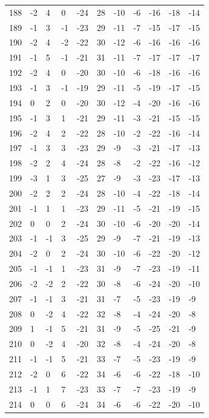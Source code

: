 \begin{table}[H]
\begin{tabular}{lllllllllll}
188 & -2 & 4 & 0 & -24 & 28 & -10 & -6 & -16 & -18 & -14 \\
189 & -1 & 3 & -1 & -23 & 29 & -11 & -7 & -15 & -17 & -15 \\
190 & -2 & 4 & -2 & -22 & 30 & -12 & -6 & -16 & -16 & -16 \\
191 & -1 & 5 & -1 & -21 & 31 & -11 & -7 & -17 & -17 & -17 \\
192 & -2 & 4 & 0 & -20 & 30 & -10 & -6 & -18 & -16 & -16 \\
193 & -1 & 3 & -1 & -19 & 29 & -11 & -5 & -19 & -17 & -15 \\
194 & 0 & 2 & 0 & -20 & 30 & -12 & -4 & -20 & -16 & -16 \\
195 & -1 & 3 & 1 & -21 & 29 & -11 & -3 & -21 & -15 & -15 \\
196 & -2 & 4 & 2 & -22 & 28 & -10 & -2 & -22 & -16 & -14 \\
197 & -1 & 3 & 3 & -23 & 29 & -9 & -3 & -21 & -17 & -13 \\
198 & -2 & 2 & 4 & -24 & 28 & -8 & -2 & -22 & -16 & -12 \\
199 & -3 & 1 & 3 & -25 & 27 & -9 & -3 & -23 & -17 & -13 \\
200 & -2 & 2 & 2 & -24 & 28 & -10 & -4 & -22 & -18 & -14 \\
201 & -1 & 1 & 1 & -23 & 29 & -11 & -5 & -21 & -19 & -15 \\
202 & 0 & 0 & 2 & -24 & 30 & -10 & -6 & -20 & -20 & -14 \\
203 & -1 & -1 & 3 & -25 & 29 & -9 & -7 & -21 & -19 & -13 \\
204 & -2 & 0 & 2 & -24 & 30 & -10 & -6 & -22 & -20 & -12 \\
205 & -1 & -1 & 1 & -23 & 31 & -9 & -7 & -23 & -19 & -11 \\
206 & -2 & -2 & 2 & -22 & 30 & -8 & -6 & -24 & -20 & -10 \\
207 & -1 & -1 & 3 & -21 & 31 & -7 & -5 & -23 & -19 & -9 \\
208 & 0 & -2 & 4 & -22 & 32 & -8 & -4 & -24 & -20 & -8 \\
209 & 1 & -1 & 5 & -21 & 31 & -9 & -5 & -25 & -21 & -9 \\
210 & 0 & -2 & 4 & -20 & 32 & -8 & -4 & -24 & -20 & -8 \\
211 & -1 & -1 & 5 & -21 & 33 & -7 & -5 & -23 & -19 & -9 \\
212 & -2 & 0 & 6 & -22 & 34 & -6 & -6 & -22 & -18 & -10 \\
213 & -1 & 1 & 7 & -23 & 33 & -7 & -7 & -23 & -19 & -9 \\
214 & 0 & 0 & 6 & -24 & 34 & -6 & -6 & -22 & -20 & -10 \\

\end{tabular}
\end{table}
